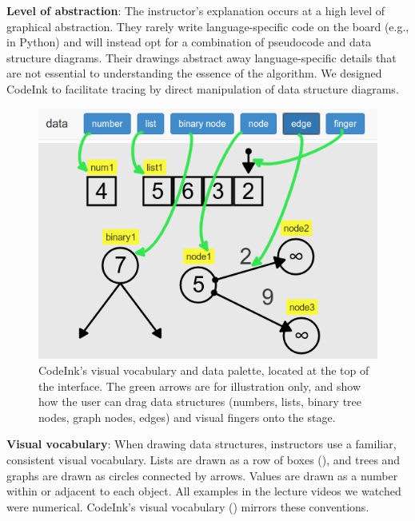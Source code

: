 \noindent \textbf{Level of abstraction}: The instructor's explanation
occurs at a high level of graphical abstraction. They rarely write
language-specific code on the board (e.g., in Python) and will instead
opt for a combination of pseudocode and data structure diagrams. Their
drawings abstract away language-specific details that are not essential
to understanding the essence of the algorithm. We designed CodeInk to
facilitate tracing by direct manipulation of data structure diagrams.


\begin{figure}
\begin{center}
\includegraphics[width=0.8\columnwidth]{img/visual-vocabulary.png}
\end{center}

\caption{CodeInk's visual vocabulary and data palette, located at the
top of the interface. The green arrows are for illustration only, and
show how the user can drag data structures (numbers, lists, binary tree
nodes, graph nodes, edges) and visual fingers onto the stage.}

\label{fig:visual_vocab}
\end{figure}

\noindent \textbf{Visual vocabulary}: When drawing data structures,
instructors use a familiar, consistent visual vocabulary. Lists are
drawn as a row of boxes (), and trees and graphs
are drawn as circles connected by arrows. Values are drawn as a number
within or adjacent to each object. All examples in the
lecture videos we watched were numerical. CodeInk's visual vocabulary
() mirrors these conventions.

